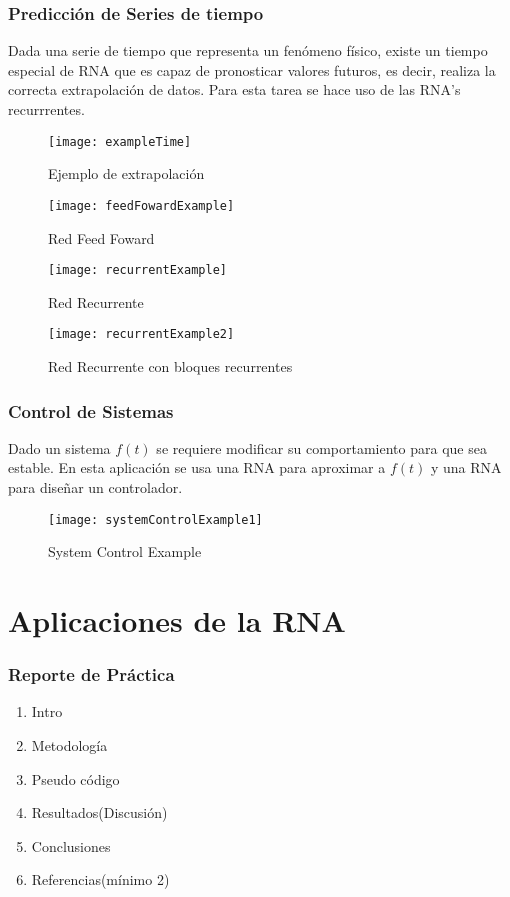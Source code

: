 \documentclass{article}
\begin{document}
\section{Predicción de Series de tiempo}
Dada una serie de tiempo que representa un fenómeno físico, existe un tiempo especial de RNA que es capaz de pronosticar valores futuros, es decir, realiza la correcta extrapolación de datos. Para esta tarea se hace uso de las RNA's recurrrentes.
\begin{figure}
	\centering
	\caption{Ejemplo de extrapolación}
	\texttt{[image: exampleTime]}	
\end{figure}

\begin{figure}
	\centering
	\caption{Red Feed Foward}
	\texttt{[image: feedFowardExample]}	
\end{figure}

\begin{figure}
	\centering
	\caption{Red Recurrente}
	\texttt{[image: recurrentExample]}	
\end{figure}

\begin{figure}
	\centering
	\caption{Red Recurrente con bloques recurrentes}
	\texttt{[image: recurrentExample2]}	
\end{figure}

\section{Control de Sistemas}
Dado un sistema $f(t)$ se requiere modificar su comportamiento para que sea estable. En esta aplicación se usa una RNA para aproximar a $f(t)$ y una RNA para diseñar un controlador.

\begin{figure}
	\centering
	\caption{System Control Example}
	\texttt{[image: systemControlExample1]}	
\end{figure}

\part{Aplicaciones de la RNA}
\section{Reporte de Práctica}
\begin{enumerate}
	\item Intro
	\item Metodología
	\item Pseudo código
	\item Resultados(Discusión)
	\item Conclusiones
	\item Referencias(mínimo 2)
\end{enumerate}
\end{document}
